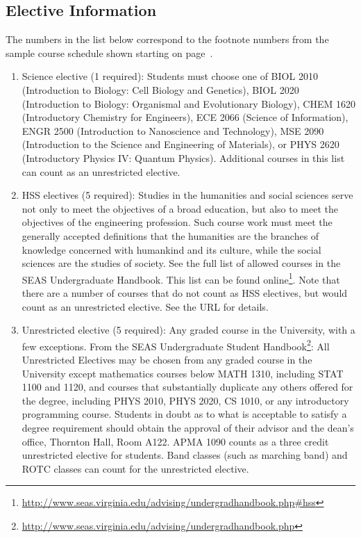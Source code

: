 \documentclass[10pt,letter]{book}
\newcommand{\myurl}[1]{\footnote{\scriptsize\url{#1}}}
\begin{document}
\subsection{Elective Information}
\label{sec:electiveinfo}

The numbers in the list below correspond to the footnote numbers from
the sample course schedule shown starting on
page~\pageref{sec:bscsschedule}.

\begin{enumerate}

\item Science elective (1 required): Students must choose one of BIOL
  2010 (Introduction to Biology: Cell Biology and Genetics),
  BIOL 2020 (Introduction to Biology: Organismal and
  Evolutionary Biology), CHEM 1620 (Introductory Chemistry for
  Engineers), ECE 2066 (Science of Information), ENGR 2500
  (Introduction to Nano\-science and Technology), MSE 2090
  (Introduction to the Science and Engineering of Materials), or PHYS
  2620 (Introductory Physics IV: Quantum Physics). Additional
  courses in this list can count as an unrestricted elective.

\item HSS electives (5 required): Studies in the humanities and social
  sciences serve not only to meet the objectives of a broad education,
  but also to meet the objectives of the engineering profession. Such
  course work must meet the generally accepted definitions that the
  humanities are the branches of knowledge concerned with humankind
  and its culture, while the social sciences are the studies of
  society. See the full list of allowed courses in the SEAS
  Undergraduate Handbook. This list can be found
  online\myurl{http://www.seas.virginia.edu/advising/undergradhandbook.php\#hss}. Note
  that there are a number of courses that do not count as HSS
  electives, but would count as an unrestricted elective. See the URL
  for details.

\item Unrestricted elective (5 required): Any graded course in the
  University, with a few exceptions. From the SEAS Undergraduate
  Student Handbook\myurl{http://www.seas.virginia.edu/advising/undergradhandbook.php}:
  All Unrestricted Electives may be chosen from any graded course in
  the University except mathematics courses below MATH 1310,
  including STAT 1100 and 1120, and courses that
  substantially duplicate any others offered for the degree, including
  PHYS 2010, PHYS 2020, CS 1010, or any introductory
  programming course. Students in doubt as to what is acceptable to
  satisfy a degree requirement should obtain the approval of their
  advisor and the dean's office, Thornton Hall, Room A122. APMA 1090
  counts as a three credit unrestricted elective for
  students. Band classes (such as marching band) and ROTC classes can
  count for the unrestricted elective.


\end{enumerate}
\end{document}
